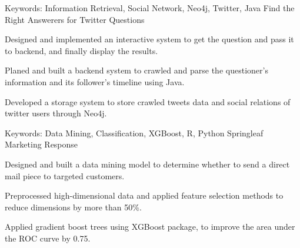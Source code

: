 \begin{cventries}

      \cventry
    {Keywords: Information Retrieval, Social Network, Neo4j, Twitter, Java} %
    {Find the Right Answerers for Twitter Questions} %
    {} %
    {} 
    {
      \begin{cvitems}
      	\item {Designed and implemented an interactive system to get the question and pass it to backend, and finally display the results.}
		\item {Planed and built a backend system to crawled and parse the questioner's information and its follower's timeline using Java.}
        \item {Developed a storage system to store crawled tweets data and social relations of twitter users through Neo4j.}
      \end{cvitems}
    }



  \cventry
    {Keywords: Data Mining, Classification, XGBoost, R, Python} %
    {Springleaf Marketing Response } %
    {} %
    {} 
    {
      \begin{cvitems}
      	\item {Designed and built a data mining model to determine whether to send a direct mail piece to targeted customers.}
        \item {Preprocessed high-dimensional data and applied feature selection methods to reduce dimensions by more than 50\%. }
        \item {Applied gradient boost trees using XGBoost package, to improve the area under the ROC curve by 0.75.}
      \end{cvitems}
    }


\end{cventries}
